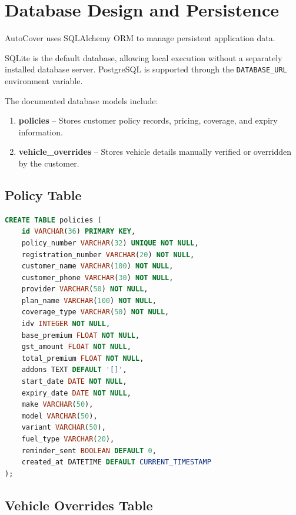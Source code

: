 \documentclass[11pt,a4paper]{article}
\begin{document}
\clearpage

\section{Database Design and Persistence}

AutoCover uses SQLAlchemy ORM to manage persistent application
data.

SQLite is the default database, allowing local execution without
a separately installed database server. PostgreSQL is supported
through the \texttt{DATABASE\_URL} environment variable.

The documented database models include:

\begin{enumerate}
    \item \textbf{policies} -- Stores customer policy records,
    pricing, coverage, and expiry information.

    \item \textbf{vehicle\_overrides} -- Stores vehicle details
    manually verified or overridden by the customer.
\end{enumerate}

\subsection{Policy Table}

\begin{lstlisting}[language=SQL,caption={Policy Table Schema}]
CREATE TABLE policies (
    id VARCHAR(36) PRIMARY KEY,
    policy_number VARCHAR(32) UNIQUE NOT NULL,
    registration_number VARCHAR(20) NOT NULL,
    customer_name VARCHAR(100) NOT NULL,
    customer_phone VARCHAR(30) NOT NULL,
    provider VARCHAR(50) NOT NULL,
    plan_name VARCHAR(100) NOT NULL,
    coverage_type VARCHAR(50) NOT NULL,
    idv INTEGER NOT NULL,
    base_premium FLOAT NOT NULL,
    gst_amount FLOAT NOT NULL,
    total_premium FLOAT NOT NULL,
    addons TEXT DEFAULT '[]',
    start_date DATE NOT NULL,
    expiry_date DATE NOT NULL,
    make VARCHAR(50),
    model VARCHAR(50),
    variant VARCHAR(50),
    fuel_type VARCHAR(20),
    reminder_sent BOOLEAN DEFAULT 0,
    created_at DATETIME DEFAULT CURRENT_TIMESTAMP
);
\end{lstlisting}

\subsection{Vehicle Overrides Table}
\end{document}
